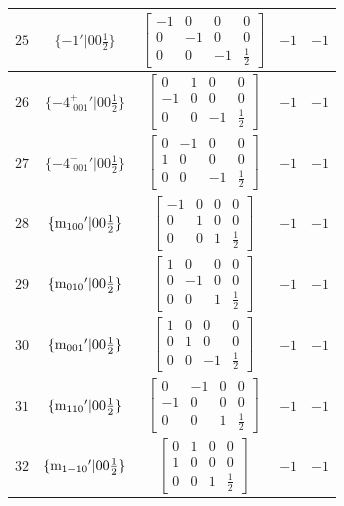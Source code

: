 \documentclass[fleqn,8pt]{jsarticle}
\begin{document}
\begin{longtable}{ccccc}
$ 25 $ & $ \{-1{}'|0 0 \frac{1}{2}\} $ & $ \begin{bmatrix} -1 & 0 & 0 & 0 \\ 0 & -1 & 0 & 0 \\ 0 & 0 & -1 & \frac{1}{2} \end{bmatrix} $ & $ -1 $ & $ -1 $ \\ \hline
$ 26 $ & $ \{-4^{+}_{\,\,001}{}'|0 0 \frac{1}{2}\} $ & $ \begin{bmatrix} 0 & 1 & 0 & 0 \\ -1 & 0 & 0 & 0 \\ 0 & 0 & -1 & \frac{1}{2} \end{bmatrix} $ & $ -1 $ & $ -1 $ \\ \hline
$ 27 $ & $ \{-4^{-}_{\,\,001}{}'|0 0 \frac{1}{2}\} $ & $ \begin{bmatrix} 0 & -1 & 0 & 0 \\ 1 & 0 & 0 & 0 \\ 0 & 0 & -1 & \frac{1}{2} \end{bmatrix} $ & $ -1 $ & $ -1 $ \\ \hline
$ 28 $ & $ \{{\rm m}_{100}{}'|0 0 \frac{1}{2}\} $ & $ \begin{bmatrix} -1 & 0 & 0 & 0 \\ 0 & 1 & 0 & 0 \\ 0 & 0 & 1 & \frac{1}{2} \end{bmatrix} $ & $ -1 $ & $ -1 $ \\ \hline
$ 29 $ & $ \{{\rm m}_{010}{}'|0 0 \frac{1}{2}\} $ & $ \begin{bmatrix} 1 & 0 & 0 & 0 \\ 0 & -1 & 0 & 0 \\ 0 & 0 & 1 & \frac{1}{2} \end{bmatrix} $ & $ -1 $ & $ -1 $ \\ \hline
$ 30 $ & $ \{{\rm m}_{001}{}'|0 0 \frac{1}{2}\} $ & $ \begin{bmatrix} 1 & 0 & 0 & 0 \\ 0 & 1 & 0 & 0 \\ 0 & 0 & -1 & \frac{1}{2} \end{bmatrix} $ & $ -1 $ & $ -1 $ \\ \hline
$ 31 $ & $ \{{\rm m}_{110}{}'|0 0 \frac{1}{2}\} $ & $ \begin{bmatrix} 0 & -1 & 0 & 0 \\ -1 & 0 & 0 & 0 \\ 0 & 0 & 1 & \frac{1}{2} \end{bmatrix} $ & $ -1 $ & $ -1 $ \\ \hline
$ 32 $ & $ \{{\rm m}_{1-10}{}'|0 0 \frac{1}{2}\} $ & $ \begin{bmatrix} 0 & 1 & 0 & 0 \\ 1 & 0 & 0 & 0 \\ 0 & 0 & 1 & \frac{1}{2} \end{bmatrix} $ & $ -1 $ & $ -1 $ \\
\end{longtable}
\end{document}
